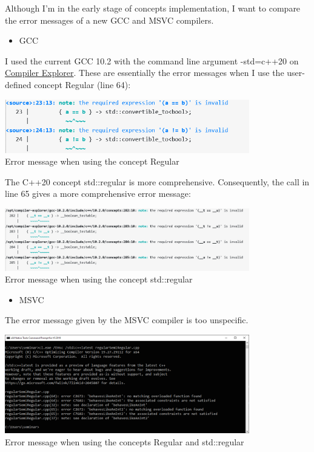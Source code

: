Although I’m in the early stage of concepts implementation, I want to compare the error messages of a new GCC and MSVC compilers.

\begin{itemize}
\item 
GCC
\end{itemize}

I used the current GCC 10.2 with the command line argument -std=c++20 on \href{https://godbolt.org/}{Compiler Explorer}. These are essentially the error messages when I use the user-defined concept Regular (line 64):

\begin{center}
\includegraphics[width=0.8\textwidth]{content/3/chapter4/images/1-6.png}\\
Error message when using the concept Regular
\end{center}

The C++20 concept std::regular is more comprehensive. Consequently, the call in line 65 gives a more comprehensive error message:

\begin{center}
\includegraphics[width=0.8\textwidth]{content/3/chapter4/images/1-7.png}\\
Error message when using the concept std::regular
\end{center}

\begin{itemize}
\item 
MSVC
\end{itemize}

The error message given by the MSVC compiler is too unspecific.

\begin{center}
\includegraphics[width=0.8\textwidth]{content/3/chapter4/images/10.png}\\
Error message when using the concepts Regular and std::regular
\end{center}


